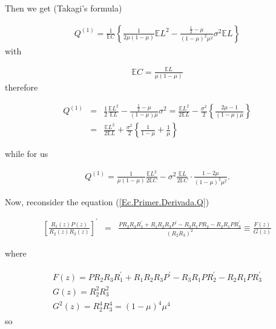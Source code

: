 \documentclass{article}
\newcommand{\esp}{\mathbb{E}}
\begin{document}
Then we get (Takagi's formula)

\begin{eqnarray*}
Q^{(1)}=\frac{1}{\esp C}\left\{\frac{1}{2\mu\left(1-\mu\right)}\esp L^{2}-\frac{\frac{1}{2}-\mu}{\left(1-\mu\right)^{2}\mu^{2}}\sigma^{2}\esp L\right\}
\end{eqnarray*}
with

\begin{eqnarray*}
\esp C = \frac{\esp L}{\mu\left(1-\mu\right)}
\end{eqnarray*}
therefore

\begin{eqnarray*}
Q^{(1)}&=&\frac{1}{2}\frac{\esp L^{2}}{\esp L}-\frac{\frac{1}{2}-\mu}{\left(1-\mu\right)\mu}\sigma^{2}
=\frac{\esp L^{2}}{2\esp L}-\frac{\sigma^{2}}{2}\left\{\frac{2\mu-1}{\left(1-\mu\right)\mu}\right\}\\
&=&\frac{\esp L^{2}}{2\esp L}+\frac{\sigma^{2}}{2}\left\{\frac{1}{1-\mu}+\frac{1}{\mu}\right\}
\end{eqnarray*}

while for us

\begin{eqnarray*}
Q^{(1)}=\frac{1}{\mu\left(1-\mu\right)}\frac{\esp L^{2}}{2\esp C}
-\sigma^{2}\frac{\esp L}{2\esp C}\cdot\frac{1-2\mu}{\left(1-\mu\right)^{2}\mu^{2}}.
\end{eqnarray*}

Now, reconsider the equation (\ref{Ec.Primer.Derivada.Q})

\begin{eqnarray*}
\left[\frac{R_{1}\left(z\right)P\left(z\right)}{R_{2}\left(z\right)R_{3}\left(z\right)}\right]^{'}&=&\frac{PR_{2}R_{3}R_{1}^{'}
+R_{1}R_{2}R_{3}P^{'}-R_{3}R_{1}PR_{2}-R_{2}R_{1}PR_{3}^{'}}{\left(R_{2}R_{3}\right)^{2}}
\equiv\frac{F\left(z\right)}{G\left(z\right)}
\end{eqnarray*}

where

\begin{eqnarray}
\begin{array}{l}
F\left(z\right)=PR_{2}R_{3}R_{1}^{'}
+R_{1}R_{2}R_{3}P^{'}-R_{3}R_{1}PR_{2}^{'}-R_{2}R_{1}PR_{3}^{'}\\
G\left(z\right)=R_{2}^{2}R_{3}^{2}\\
G^{2}\left(z\right)=R_{2}^{4}R_{3}^{4}=\left(1-\mu\right)^{4}\mu^{4}
\end{array}
\end{eqnarray}
so 
\end{document}
